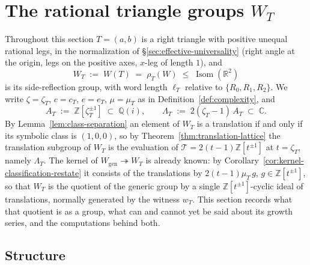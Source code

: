 \documentclass[11pt]{article}
\theoremstyle{plain}
\theoremstyle{definition}
\theoremstyle{remark}
\newcommand{\Z}{\mathbb{Z}}
\newcommand{\Q}{\mathbb{Q}}
\newcommand{\R}{\mathbb{R}}
\newcommand{\C}{\mathbb{C}}
\DeclareMathOperator{\Isom}{Isom}
\begin{document}
\section{The rational triangle groups \texorpdfstring{$W_T$}{W\_T}}
\label{sec:rational-WT}

Throughout this section $T=(a,b)$ is a right triangle with positive unequal
rational legs, in the normalization of \S\ref{sec:effective-universality}
(right angle at the origin, legs on the positive axes, $x$-leg of length $1$),
and
\[
  W_T \;:=\; W(T) \;=\; \rho_T(W) \;\le\; \Isom(\R^2)
\]
is its side-reflection group, with word length $\ell_T$ relative to
$\{R_0,R_1,R_2\}$. We write $\zeta=\zeta_T$, $c=c_T$, $e=e_T$, $\mu=\mu_T$ as in
Definition~\ref{def:complexity}, and
\[
  A_T \;:=\; \Z[\zeta_T^{\pm1}] \;\subset\; \Q(i),
  \qquad
  \Lambda_T \;:=\; 2(\zeta_T-1)\,A_T \;\subset\; \C .
\]
By Lemma~\ref{lem:class-separation} an element of $W_T$ is a translation if
and only if its symbolic class is $(1,0,0)$, so by
Theorem~\ref{thm:translation-lattice} the translation subgroup of $W_T$ is the
evaluation of $\mathcal T=2(t-1)\Z[t^{\pm1}]$ at $t=\zeta_T$, namely
$\Lambda_T$. The kernel of $W_{\mathrm{gen}}\twoheadrightarrow W_T$ is already
known: by Corollary~\ref{cor:kernel-classification-restate} it consists of
the translations by $2(t-1)\mu_T\,g$, $g\in\Z[t^{\pm1}]$, so that $W_T$ is the
quotient of the generic group by a single $\Z[t^{\pm1}]$-cyclic ideal of
translations, normally generated by the witness $w_T$. This section records
what that quotient is as a group, what can and cannot yet be said about its
growth series, and the computations behind both.

\subsection{Structure}
\end{document}
